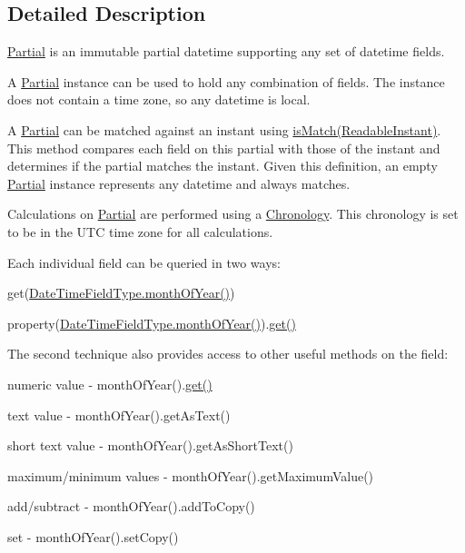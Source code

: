 \subsection{Detailed Description}
\hyperlink{classorg_1_1joda_1_1time_1_1_partial}{Partial} is an immutable partial datetime supporting any set of datetime fields. 

A \hyperlink{classorg_1_1joda_1_1time_1_1_partial}{Partial} instance can be used to hold any combination of fields. The instance does not contain a time zone, so any datetime is local. 

A \hyperlink{classorg_1_1joda_1_1time_1_1_partial}{Partial} can be matched against an instant using \hyperlink{classorg_1_1joda_1_1time_1_1_partial_a58d6ea7ae840e6af5f5fa342e3cfc3f0}{is\-Match(\-Readable\-Instant)}. This method compares each field on this partial with those of the instant and determines if the partial matches the instant. Given this definition, an empty \hyperlink{classorg_1_1joda_1_1time_1_1_partial}{Partial} instance represents any datetime and always matches. 

Calculations on \hyperlink{classorg_1_1joda_1_1time_1_1_partial}{Partial} are performed using a \hyperlink{classorg_1_1joda_1_1time_1_1_chronology}{Chronology}. This chronology is set to be in the U\-T\-C time zone for all calculations. 

Each individual field can be queried in two ways\-: 
\begin{DoxyItemize}
\item {\ttfamily get(\hyperlink{classorg_1_1joda_1_1time_1_1_date_time_field_type_af480e01e66978a49e99178a018249861}{Date\-Time\-Field\-Type.\-month\-Of\-Year()})} 
\item {\ttfamily property(\hyperlink{classorg_1_1joda_1_1time_1_1_date_time_field_type_af480e01e66978a49e99178a018249861}{Date\-Time\-Field\-Type.\-month\-Of\-Year()}).\hyperlink{classorg_1_1joda_1_1time_1_1base_1_1_abstract_partial_aceac8b22fd87e01003163b68d41bc7d8}{get()}} 
\end{DoxyItemize}The second technique also provides access to other useful methods on the field\-: 
\begin{DoxyItemize}
\item numeric value -\/ {\ttfamily month\-Of\-Year().\hyperlink{classorg_1_1joda_1_1time_1_1base_1_1_abstract_partial_aceac8b22fd87e01003163b68d41bc7d8}{get()}} 
\item text value -\/ {\ttfamily month\-Of\-Year().get\-As\-Text()} 
\item short text value -\/ {\ttfamily month\-Of\-Year().get\-As\-Short\-Text()} 
\item maximum/minimum values -\/ {\ttfamily month\-Of\-Year().get\-Maximum\-Value()} 
\item add/subtract -\/ {\ttfamily month\-Of\-Year().add\-To\-Copy()} 
\item set -\/ {\ttfamily month\-Of\-Year().set\-Copy()} 
\end{DoxyItemize}

